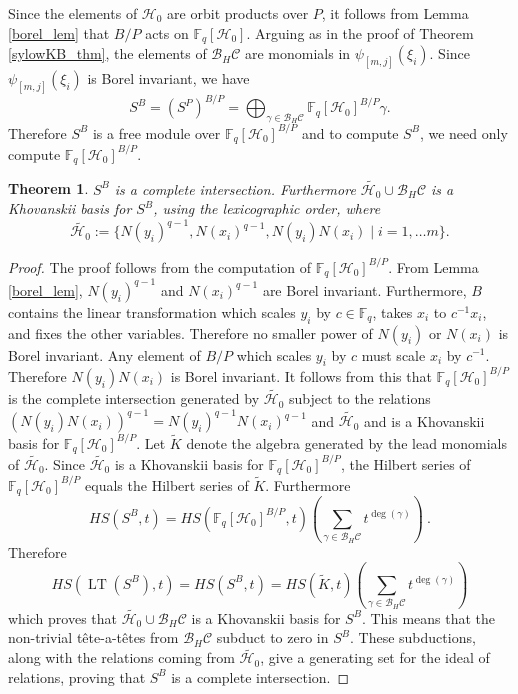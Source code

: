 \documentclass{amsart}
\newcommand{\field}{\mathbb{F}}
\newcommand{\HH}{\mathcal{H}}
\newcommand{\BH}{\mathcal{B}_H}
\newcommand{\tat}{t\^ete-a-t\^ete}
\newtheorem{thm}[subsection]{Theorem}
\DeclareMathOperator{\lt}{LT}
\begin{document}
Since the elements of $\HH_0$ are orbit products over $P$, it follows from Lemma \ref{borel_lem} that $B/P$ acts on $\field_q[\HH_0]$.
Arguing as in the proof of Theorem \ref{sylowKB_thm}, the elements of $\BH\mathcal{C}$ are monomials in  $\psi_{[m,j]}(\xi_{i})$. 
Since $\psi_{[m,j]}(\xi_{i})$ is Borel invariant, we have 
$$S^B=(S^P)^{B/P}=\bigoplus_{\gamma\in\BH\mathcal{C}} \field_q[\HH_0]^{B/P}\gamma.$$
Therefore $S^B$ is a free module over $\field_q[\HH_0]^{B/P}$ and to compute $S^B$, we need only compute $\field_q[\HH_0]^{B/P}$.


\begin{thm} \label{Bor_inv} $S^B$ is a complete intersection. 
Furthermore $\widetilde{\HH_0}\cup \BH\mathcal{C}$ is a Khovanskii basis for $S^B$, using the lexicographic order, where 
$$\widetilde{\HH_0}:=\{N(y_i)^{q-1},N(x_i)^{q-1}, N(y_i)N(x_i)\mid i=1,\ldots m\} .$$
\end{thm}
\begin{proof} The proof follows from the computation of $\field_q[\HH_0]^{B/P}$.
From Lemma \ref{borel_lem},
$N(y_i)^{q-1}$ and $N(x_i)^{q-1}$ are Borel invariant. 
Furthermore, $B$ contains the linear transformation which scales $y_i$ by $c\in\field_q$, takes $x_i$ to $c^{-1}x_i$, and fixes the other variables.
Therefore no smaller power of $N(y_i)$ or $N(x_i)$ is Borel invariant. Any element of $B/P$ which scales $y_i$ by $c$ must scale $x_i$ by $c^{-1}$.
Therefore $N(y_i)N(x_i)$ is Borel invariant. It follows from this that  $\field_q[\HH_0]^{B/P}$ is the complete intersection generated by
$\widetilde{\HH_0}$ subject to the relations 
$(N(y_i)N(x_i))^{q-1}=N(y_i)^{q-1}N(x_i)^{q-1}$ and $\widetilde{\HH_0}$ and is a Khovanskii basis for $\field_q[\HH_0]^{B/P}$. 
Let $\widetilde{K}$ denote the algebra generated by the lead monomials of $\widetilde{\HH_0}$.
Since $\widetilde{\HH_0}$ is a Khovanskii basis for $\field_q[\HH_0]^{B/P}$,
the Hilbert series of $\field_q[\HH_0]^{B/P}$ equals the Hilbert series of $\widetilde{K}$.
Furthermore
$$HS(S^B,t)=HS(\field_q[\HH_0]^{B/P},t)
\left(\sum_{\gamma\in\BH\mathcal{C}} t^{\deg(\gamma)} \right)\ .$$
Therefore
$$HS(\lt(S^B),t)=HS(S^B,t)=HS(\widetilde{K},t)\left(\sum_{\gamma\in\BH\mathcal{C}} t^{\deg(\gamma)} \right)$$
 which proves that  $\widetilde{\HH_0}\cup \BH\mathcal{C}$ is a Khovanskii basis for $S^B$.
This means that the non-trivial \tat s from $\BH\mathcal{C}$ subduct to zero in $S^B$.
These subductions, along with the relations coming from $\widetilde{\HH_0}$, give a generating set for the ideal of relations, proving that $S^B$ is a complete intersection.
\end{proof}
\end{document}
